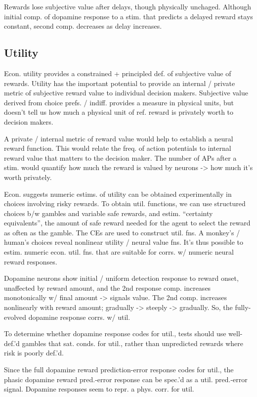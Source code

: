 \documentclass{article}
\numberwithin{equation}{section}
\begin{document}
Rewards lose subjective value after delays, though physically unchaged. Although initial comp. of dopamine response to a stim. that predicts a delayed reward stays constant, second comp. decreases as delay increases.

\subsection{Utility}

Econ. utility provides a constrained + principled def. of subjective value of rewards. Utility has the important potential to provide an internal / private metric of subjective reward value to individual decision makers. Subjective value derived from choice prefs. / indiff. provides a measure in physical units, but doesn't tell us how much a physical unit of ref. reward is privately worth to decision makers.

A private / internal metric of reward value would help to establish a neural reward function. This would relate the freq. of action potentials to internal reward value that matters to the decision maker. The number of APs after a stim. would quantify how much the reward is valued by neurons -> how much it's worth privately.

Econ. suggests numeric estims. of utility can be obtained experimentally in choices involving risky rewards. To obtain util. functions, we can use structured choices b/w gambles and variable safe rewards, and estim. ``certainty equivalents'', the amount of safe reward needed for the agent to select the reward as often as the gamble. The CEs are used to construct util. fns. A monkey's / human's choices reveal nonlinear utility / neural value fns. It's thus possible to estim. numeric econ. util. fns. that are suitable for corrs. w/ numeric neural reward responses.

Dopamine neurons show initial / uniform detection response to reward onset, unaffected by reward amount, and the 2nd response comp. increases monotonically w/ final amount -> signals value. The 2nd comp. increases nonlinearly with reward amount; gradually -> steeply -> gradually. So, the fully-evolved dopamine response corrs. w/ util.

To determine whether dopamine response codes for util., tests should use well-def.'d gambles that sat. conds. for util., rather than unpredicted rewards where risk is poorly def.'d.

Since the full dopamine reward prediction-error response codes for util., the phasic dopamine reward pred.-error response can be spec.'d as a util. pred.-error signal. Dopamine responses seem to repr. a phys. corr. for util.
\end{document}
